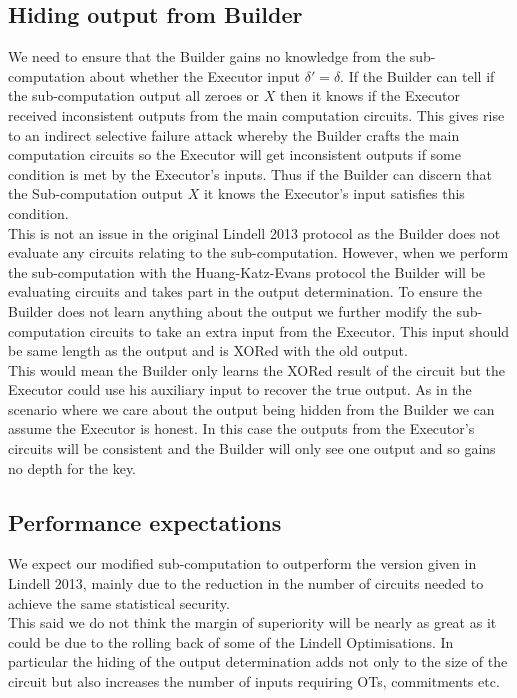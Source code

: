 \documentclass[ %
                    author={Nicholas Tutte},
                supervisor={Prof. Nigel Smart},
                    degree={MEng},
                     title={Secure Two Party Computation},
                  subtitle={A practical comparison of recent protocols},
                      type={Research - GG1K},
                      year={2015} ]{dissertation}
\begin{document}
			\subsection{Hiding output from Builder}
				We need to ensure that the Builder gains no knowledge from the sub-computation about whether the Executor input $\delta' = \delta$. If the Builder can tell if the sub-computation output all zeroes or $X$ then it knows if the Executor received inconsistent outputs from the main computation circuits. This gives rise to an indirect selective failure attack whereby the Builder crafts the main computation circuits so the Executor will get inconsistent outputs if some condition is met by the Executor's inputs. Thus if the Builder can discern that the Sub-computation output $X$ it knows the Executor's input satisfies this condition.\\

				This is not an issue in the original Lindell 2013 protocol as the Builder does not evaluate any circuits relating to the sub-computation. However, when we perform the sub-computation with the Huang-Katz-Evans protocol the Builder will be evaluating circuits and takes part in the output determination. To ensure the Builder does not learn anything about the output we further modify the sub-computation circuits to take an extra input from the Executor. This input should be same length as the output and is XORed with the old output.\\

				This would mean the Builder only learns the XORed result of the circuit but the Executor could use his auxiliary input to recover the true output. As in the scenario where we care about the output being hidden from the Builder we can assume the Executor is honest. In this case the outputs from the Executor's circuits will be consistent and the Builder will only see one output and so gains no depth for the key.

			\subsection{Performance expectations}

				We expect our modified sub-computation to outperform the version given in Lindell 2013, mainly due to the reduction in the number of circuits needed to achieve the same statistical security.\\

				This said we do not think the margin of superiority will be nearly as great as it could be due to the rolling back of some of the Lindell Optimisations. In particular the hiding of the output determination adds not only to the size of the circuit but also increases the number of inputs requiring OTs, commitments etc.\\
\end{document}
